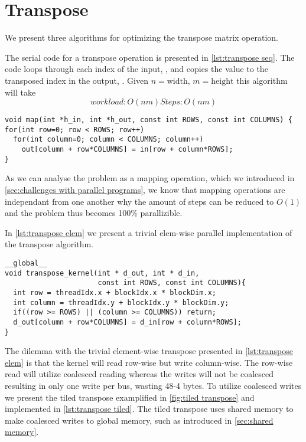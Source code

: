 \section{Transpose}
\label{sec:transpose}

We present three algorithms for optimizing the transpose matrix operation.

The serial code for a transpose operation is presented in \cref{lst:transpose seq}.
The code loops through each index of the input, , and copies the value to the transposed index in the output, .
Given $n=\mathrm{width}$, $m=\mathrm{height}$ this algorithm will take
\begin{equation*}
workload: O(nm)
Steps: O(nm)
\end{equation*}

\begin{lstlisting}[caption={Serial transpose}, label={lst:transpose seq}]
void map(int *h_in, int *h_out, const int ROWS, const int COLUMNS) {
for(int row=0; row < ROWS; row++)
  for(int column=0; column < COLUMNS; column++)
    out[column + row*COLUMNS] = in[row + column*ROWS];
}
\end{lstlisting}

As we can analyse the problem as a mapping operation, which we introduced in \cref{sec:challenges with parallel programs}, we know that mapping operations are independant from one another why the amount of steps can be reduced to $O(1)$ and the problem thus becomes 100\% parallizible.

In \cref{lst:transpose elem} we present a trivial elem-wise parallel implementation of the transpose algorithm.

\begin{lstlisting}[caption={Parallel transpose}, label={lst:transpose elem}]
__global__
void transpose_kernel(int * d_out, int * d_in,
                      const int ROWS, const int COLUMNS){
  int row = threadIdx.x + blockIdx.x * blockDim.x;
  int column = threadIdx.y + blockIdx.y * blockDim.y;
  if((row >= ROWS) || (column >= COLUMNS)) return;
  d_out[column + row*COLUMNS] = d_in[row + column*ROWS];
}
\end{lstlisting}

The dilemma with the trivial element-wise transpose presented in \cref{lst:transpose elem} is that the kernel will read row-wise but write column-wise.
The row-wise read will utilize coalesced reading whereas the writes will not be coalesced resulting in only one write per bus, wasting 48-4 bytes.
To utilize coalesced writes we present the tiled transpose examplified in \cref{fig:tiled transpose} and implemented in \cref{lst:transpose tiled}.
The tiled transpose uses shared memory to make coalesced writes to global memory, such as introduced in \cref{sec:shared memory}.


